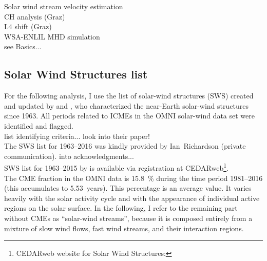 Solar wind stream velocity estimation\\
CH analysis (Graz)\\
L4 shift (Graz)\\
WSA-ENLIL MHD simulation\\
see Basics...\\

\subsection{Solar Wind Structures list}
For the following analysis, I use the list of solar-wind structures (SWS) created and updated by \citet{Richardson2000} and \citet{Richardson2012}, who characterized the near-Earth solar-wind structures since 1963. All periods related to ICMEs in the OMNI solar-wind data set were identified and flagged.\\

list identifying criteria... look into their paper!\\

The SWS list for 1963--2016 was kindly provided by Ian~Richardson (private communication). into acknowledgments...\\

SWS list for 1963--2015 by \citep{Richardson2000,Richardson2012} is available via registration at CEDARweb\footnote{CEDARweb website for Solar Wind Structures: }.\\

The CME fraction in the OMNI data is \SI{15.8}{\%} during the time period 1981--2016 (this accumulates to 5.53~years).
This percentage is an average value. It varies heavily with the solar activity cycle and with the appearance of individual active regions on the solar surface. In the following, I refer to the remaining part without CMEs as ``solar-wind streams'', because it is composed entirely from a mixture of slow wind flows, fast wind streams, and their interaction regions.

